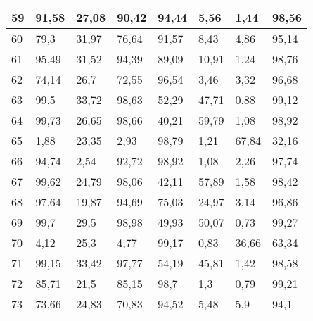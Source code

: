 \begin{longtable}[c]{|l|l|l|l|l|l|l|l|}
59              & 91,58        & 27,08        & 90,42       & 94,44         & 5,56          & 1,44          & 98,56         \\ \hline
60              & 79,3         & 31,97        & 76,64       & 91,57         & 8,43          & 4,86          & 95,14         \\ \hline
61              & 95,49        & 31,52        & 94,39       & 89,09         & 10,91         & 1,24          & 98,76         \\ \hline
62              & 74,14        & 26,7         & 72,55       & 96,54         & 3,46          & 3,32          & 96,68         \\ \hline
63              & 99,5         & 33,72        & 98,63       & 52,29         & 47,71         & 0,88          & 99,12         \\ \hline
64              & 99,73        & 26,65        & 98,66       & 40,21         & 59,79         & 1,08          & 98,92         \\ \hline
65              & 1,88         & 23,35        & 2,93        & 98,79         & 1,21          & 67,84         & 32,16         \\ \hline
66              & 94,74        & 2,54         & 92,72       & 98,92         & 1,08          & 2,26          & 97,74         \\ \hline
67              & 99,62        & 24,79        & 98,06       & 42,11         & 57,89         & 1,58          & 98,42         \\ \hline
68              & 97,64        & 19,87        & 94,69       & 75,03         & 24,97         & 3,14          & 96,86         \\ \hline
69              & 99,7         & 29,5         & 98,98       & 49,93         & 50,07         & 0,73          & 99,27         \\ \hline
70              & 4,12         & 25,3         & 4,77        & 99,17         & 0,83          & 36,66         & 63,34         \\ \hline
71              & 99,15        & 33,42        & 97,77       & 54,19         & 45,81         & 1,42          & 98,58         \\ \hline
72              & 85,71        & 21,5         & 85,15       & 98,7          & 1,3           & 0,79          & 99,21         \\ \hline
73              & 73,66        & 24,83        & 70,83       & 94,52         & 5,48          & 5,9           & 94,1          \\ \hline

\end{longtable}
